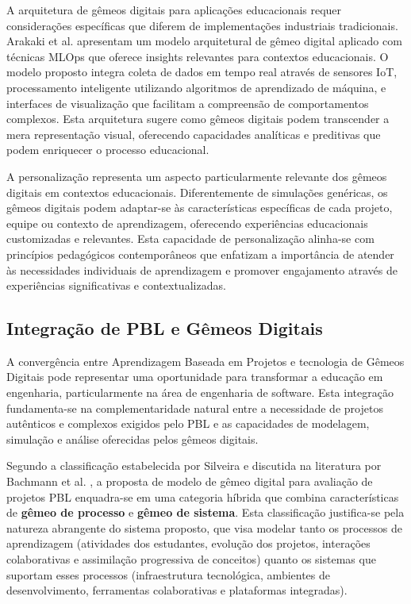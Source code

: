 \documentclass[12pt, a4paper, oneside]{abntex2}
\begin{document}
A arquitetura de gêmeos digitais para aplicações educacionais requer considerações específicas que diferem de implementações industriais tradicionais. Arakaki et al. \cite{arakaki2022} apresentam um modelo arquitetural de gêmeo digital aplicado com técnicas MLOps que oferece insights relevantes para contextos educacionais. O modelo proposto integra coleta de dados em tempo real através de sensores IoT, processamento inteligente utilizando algoritmos de aprendizado de máquina, e interfaces de visualização que facilitam a compreensão de comportamentos complexos. Esta arquitetura sugere como gêmeos digitais podem transcender a mera representação visual, oferecendo capacidades analíticas e preditivas que podem enriquecer o processo educacional.

A personalização representa um aspecto particularmente relevante dos gêmeos digitais em contextos educacionais. Diferentemente de simulações genéricas, os gêmeos digitais podem adaptar-se às características específicas de cada projeto, equipe ou contexto de aprendizagem, oferecendo experiências educacionais customizadas e relevantes. Esta capacidade de personalização alinha-se com princípios pedagógicos contemporâneos que enfatizam a importância de atender às necessidades individuais de aprendizagem e promover engajamento através de experiências significativas e contextualizadas.

\subsection{Integração de PBL e Gêmeos Digitais}

A convergência entre Aprendizagem Baseada em Projetos e tecnologia de Gêmeos Digitais pode representar uma oportunidade para transformar a educação em engenharia, particularmente na área de engenharia de software. Esta integração fundamenta-se na complementaridade natural entre a necessidade de projetos autênticos e complexos exigidos pelo PBL e as capacidades de modelagem, simulação e análise oferecidas pelos gêmeos digitais.

Segundo a classificação estabelecida por Silveira \cite{silveira2024panorama} e discutida na literatura por Bachmann et al. \cite{bachmann2023}, a proposta de modelo de gêmeo digital para avaliação de projetos PBL enquadra-se em uma categoria híbrida que combina características de \textbf{gêmeo de processo} e \textbf{gêmeo de sistema}. Esta classificação justifica-se pela natureza abrangente do sistema proposto, que visa modelar tanto os processos de aprendizagem (atividades dos estudantes, evolução dos projetos, interações colaborativas e assimilação progressiva de conceitos) quanto os sistemas que suportam esses processos (infraestrutura tecnológica, ambientes de desenvolvimento, ferramentas colaborativas e plataformas integradas).
\end{document}
